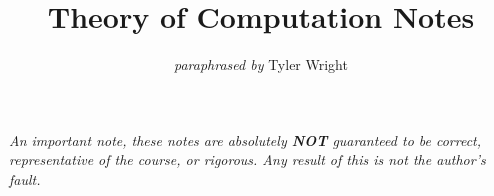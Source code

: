 \documentclass[a4paper, 12pt, twoside]{article}
\begin{document}
\title{Theory of Computation Notes}
\date{}
\author{\textit{paraphrased by} Tyler Wright}
\maketitle

\vfill

\textit{An important note, these notes are absolutely \textbf{NOT}
  guaranteed to be correct, representative of the course, or rigorous.
  Any result of this is not the author's fault.}

% 

\newpage

\tableofcontents






\end{document}
